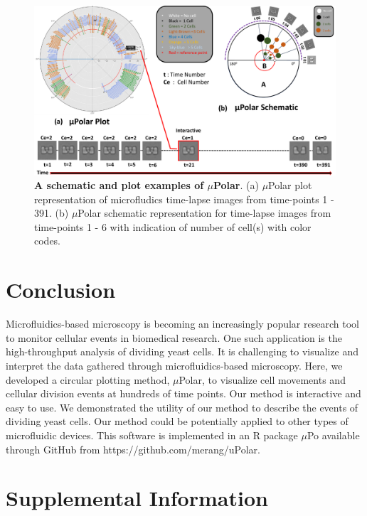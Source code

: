 \documentclass[conference]{IEEEtran}
\begin{document}
\begin{figure}
\centering
\includegraphics[width=\textwidth,height=10 cm]{Patterns/polar.pdf}
\caption{ \textbf{ A schematic and plot examples of $\mu$Polar}. (a) $\mu$Polar plot representation of microfludics time-lapse images from time-points 1 - 391. (b) $\mu$Polar schematic representation for time-lapse images from time-points 1 - 6 with indication of number of cell(s) with color codes.}
\label{fig:polar}
\end{figure}


\section{Conclusion}
Microfluidics-based microscopy is becoming an increasingly popular research tool to monitor cellular events in biomedical research. One such application is the high-throughput analysis of dividing yeast cells. It is challenging to visualize and interpret the data gathered through microfluidics-based microscopy. Here, we developed a circular plotting method, $\mu$Polar, to visualize cell movements and cellular division events at hundreds of time points. Our method is interactive and easy to use. We demonstrated the utility of our method to describe the events of dividing yeast cells. Our method could be potentially applied to other types of microfluidic devices. This software is implemented in an R package $\mu$Po available through GitHub from https://github.com/merang/uPolar.



\section{Supplemental Information}
\end{document}

